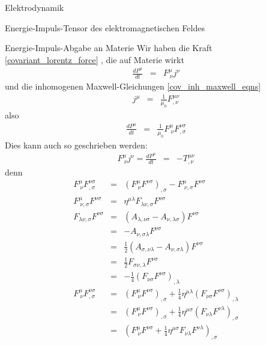 \begin{chapter}{\titlestr}
\begin{section}{Elektrodynamik}
\begin{subsection}{Energie-Impuls-Tensor des elektromagnetischen Feldes}
\begin{subsubsection}{Energie-Impuls-Abgabe an Materie}
Wir haben die Kraft \ref{covariant_lorentz_force}
, die auf Materie wirkt 
\begin{eqnarray*}
\frac{dP^\mu}{dt} &=& F^\mu_{\ \nu}j^\nu
\end{eqnarray*}
und die inhomogenen Maxwell-Gleichungen \ref{cov_inh_maxwell_eqns} %
\begin{eqnarray}
\label{cov_maxwell_eqns}
j^\mu &=& \frac{1}{\mu_0}F^{\mu\nu}_{,\nu}
\end{eqnarray}
also
\begin{eqnarray*}
\frac{dP^\mu}{dt} &=& \frac{1}{\mu_0}F^\mu_{\ \nu}F^{\nu\sigma}_{,\sigma}
\end{eqnarray*}
Dies kann auch so geschrieben werden:
\begin{eqnarray}
\label{energy_absorbtion}
F^\mu_{\ \nu}j^\nu = \frac{dP^\mu}{dt} &=& -T^{\mu\nu}_{,\nu}
\end{eqnarray}
denn
\begin{eqnarray*}
F^\mu_{\ \nu}F^{\nu\sigma}_{,\sigma} &=&\left(F^\mu_{\ \nu}F^{\nu\sigma}\right)_{,\sigma}-F^\mu_{\ \nu,\sigma}F^{\nu\sigma}\\
F^\mu_{\ \nu,\sigma}F^{\nu\sigma} &=& \eta^{\mu\lambda}F_{\lambda\nu,\sigma}F^{\nu\sigma}\\
F_{\lambda\nu,\sigma}F^{\nu\sigma} &=& \left(A_{\lambda,\nu\sigma}-A_{\nu,\lambda\sigma}\right)F^{\nu\sigma}\\
&=& -A_{\nu,\sigma\lambda}F^{\nu\sigma}\\
&=& \frac{1}{2}\left(A_{\sigma,\nu\lambda}-A_{\nu,\sigma\lambda}\right)F^{\nu\sigma}\\
&=& \frac{1}{2}F_{\sigma\nu,\lambda}F^{\nu\sigma}\\
&=& -\frac{1}{4}\left(F_{\nu\sigma}F^{\nu\sigma}\right)_{,\lambda}\\
F^\mu_{\ \nu}F^{\nu\sigma}_{,\sigma} &=&\left(F^\mu_{\ \nu}F^{\nu\sigma}\right)_{,\sigma}+\frac{1}{4}\eta^{\mu\lambda}\left(F_{\nu\sigma}F^{\nu\sigma}\right)_{,\lambda}\\
&=&\left(F^\mu_{\ \nu}F^{\nu\sigma}\right)_{,\sigma}+\frac{1}{4}\eta^{\mu\sigma}\left(F_{\nu\lambda}F^{\nu\lambda}\right)_{,\sigma}\\
&=&\left(F^\mu_{\ \nu}F^{\nu\sigma}+\frac{1}{4}\eta^{\mu\sigma}F_{\nu\lambda}F^{\nu\lambda}\right)_{,\sigma}
\end{eqnarray*}

\end{subsubsection}
\end{subsection}
\end{section}
\end{chapter}
